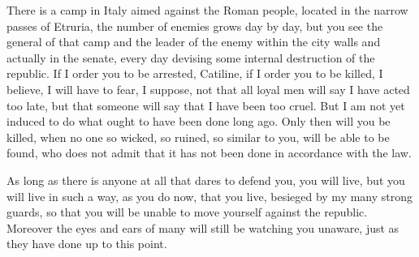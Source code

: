 {  There is a camp in Italy aimed against the Roman people, located in the narrow passes of Etruria, the number of enemies grows day by day, but you see the general of that camp and the leader of the enemy within the city walls and actually in the senate, every day devising some internal destruction of the republic. If I order you to be arrested, Catiline, if I order you to be killed, I believe, I will have to fear, I suppose, not that all loyal men will say I have acted too late, but that someone will say that I have been too cruel. But I am not yet induced to do what ought to have been done long ago. Only then will you be killed, when no one so wicked, so ruined, so similar to you, will be able to be found, who does not admit that it has not been done in accordance with the law.

  As long as there is anyone at all that dares to defend you, you will live, but you will live in such a way, as you do now, that you live, besieged by my many strong guards, so that you will be unable to move yourself against the republic. Moreover the eyes and ears of many will still be watching you unaware, just as they have done up to this point.
}

